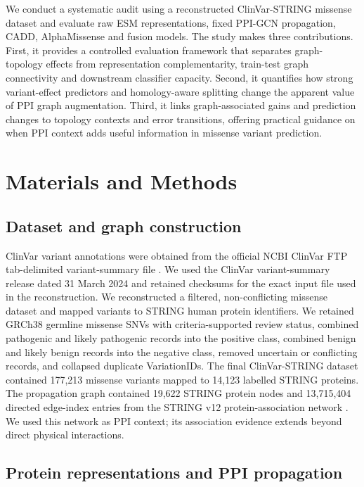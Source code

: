 \documentclass[conference]{IEEEtran}
\begin{document}
We conduct a systematic audit using a reconstructed ClinVar-STRING missense dataset and evaluate raw ESM representations, fixed PPI-GCN propagation, CADD, AlphaMissense and fusion models. The study makes three contributions. First, it provides a controlled evaluation framework that separates graph-topology effects from representation complementarity, train-test graph connectivity and downstream classifier capacity. Second, it quantifies how strong variant-effect predictors and homology-aware splitting change the apparent value of PPI graph augmentation. Third, it links graph-associated gains and prediction changes to topology contexts and error transitions, offering practical guidance on when PPI context adds useful information in missense variant prediction.

\section{Materials and Methods}

\subsection{Dataset and graph construction}

ClinVar variant annotations were obtained from the official NCBI ClinVar FTP tab-delimited variant-summary file \cite{Landrum2020ClinVar}. We used the ClinVar variant-summary release dated 31 March 2024 and retained checksums for the exact input file used in the reconstruction. We reconstructed a filtered, non-conflicting missense dataset and mapped variants to STRING human protein identifiers. We retained GRCh38 germline missense SNVs with criteria-supported review status, combined pathogenic and likely pathogenic records into the positive class, combined benign and likely benign records into the negative class, removed uncertain or conflicting records, and collapsed duplicate VariationIDs. The final ClinVar-STRING dataset contained 177,213 missense variants mapped to 14,123 labelled STRING proteins. The propagation graph contained 19,622 STRING protein nodes and 13,715,404 directed edge-index entries from the STRING v12 protein-association network \cite{Szklarczyk2023STRING}. We used this network as PPI context; its association evidence extends beyond direct physical interactions.

\subsection{Protein representations and PPI propagation}
\end{document}
